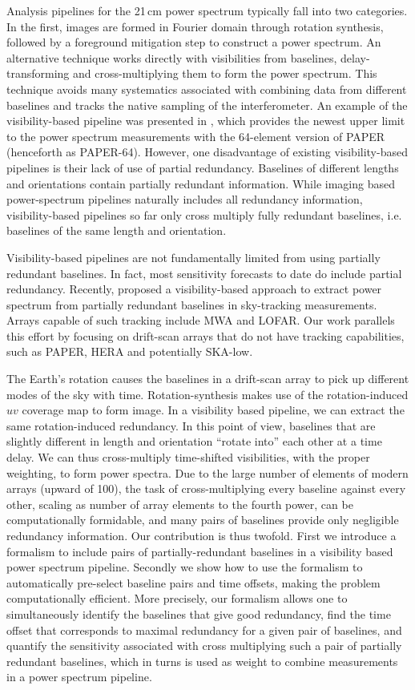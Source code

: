 \documentclass[twocolumn,apj,numberedappendix]{emulateapj}
\renewcommand\[{\begin{equation}}
\renewcommand\]{\end{equation}}
\begin{document}
Analysis pipelines for the 21\,cm power spectrum typically fall into two categories. In the first, images are formed in Fourier domain through rotation synthesis, followed by a foreground mitigation step to construct a power spectrum. An alternative technique works directly with visibilities from baselines, delay-transforming and cross-multiplying them to form the power spectrum. This technique avoids many systematics associated with combining data from different baselines and tracks the native sampling of the interferometer. An example of the visibility-based pipeline was presented in \cite{Ali2015}, which provides the newest upper limit to the power spectrum
measurements with the 64-element version of PAPER (henceforth as PAPER-64). However, one disadvantage of existing visibility-based pipelines is their lack of use of partial redundancy. Baselines of different lengths and orientations contain partially redundant information. While imaging based power-spectrum pipelines naturally includes all redundancy information, visibility-based pipelines so far only cross multiply fully redundant baselines, i.e. baselines of the same length and orientation.

Visibility-based pipelines are not fundamentally limited from using partially redundant baselines. In fact, most sensitivity forecasts to date do include partial redundancy. Recently, \cite{wterm} proposed a visibility-based approach to extract power spectrum from partially redundant baselines in sky-tracking measurements. Arrays capable of such tracking include MWA and LOFAR. Our work parallels this effort by focusing on drift-scan arrays that do not have tracking capabilities, such as PAPER, HERA and potentially SKA-low.

The Earth's rotation causes the baselines in a drift-scan array to pick up different modes of the sky with time. Rotation-synthesis makes use of the rotation-induced $uv$ coverage map to form image. In a visibility based pipeline, we can extract the same rotation-induced redundancy. In this point of view, baselines that are slightly different in length and orientation
``rotate into'' each other at a time delay. We can thus cross-multiply time-shifted visibilities, with the proper weighting, to form power spectra.  Due to the large number of elements of modern arrays (upward of 100), the task of cross-multiplying every baseline against every other, scaling as number of array elements to the fourth power, can be computationally formidable, and many pairs of baselines provide only negligible redundancy information. Our contribution is thus twofold. First we introduce a formalism to include pairs of partially-redundant baselines in a visibility based power spectrum pipeline. Secondly we show how to use the formalism to automatically pre-select baseline pairs and time offsets, making the problem computationally efficient. More precisely, our formalism allows one to simultaneously identify the baselines that give good
redundancy, find the time offset that corresponds to maximal redundancy for a given pair of baselines, and quantify the sensitivity associated with cross multiplying
such a pair of partially redundant baselines, which in turns is used as weight to combine measurements in a power spectrum pipeline. 
\end{document}
